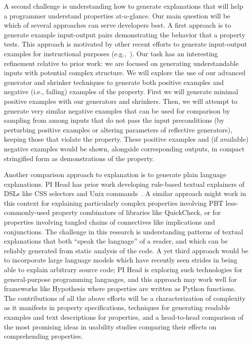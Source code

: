 A second challenge is understanding how to generate explanations that will help 
a programmer understand properties at-a-glance. Our main question will be which 
of several approaches can serve developers best. A first approach is to generate 
example input-output pairs demonstrating the behavior that a property tests.  
This approach is motivated by other recent efforts to generate input-output 
examples for instructional
purposes (e.g.,~\cite{ref:gerdes2018understanding,ref:dantoni2015can}). Our task 
has an interesting refinement relative to prior work: we are focused on 
generating understandable inputs with potential complex structure. We will
explore the use of our advanced generator and shrinker techniques to generate 
both positive examples and negative (i.e., failing) examples of the property.  
First we will generate minimal positive examples with our generators and 
shrinkers. Then, we will attempt to generate very similar negative examples that 
can be used for comparison by sampling from among inputs that do not pass the 
input preconditions (by perturbing positive examples or altering parameters of 
reflective generators), keeping those that violate the property. These positive 
examples and (if available) negative examples would be shown, alongside 
corresponding outputs, in compact stringified form as demonstrations of the 
property.

Another comparison approach to explanation is to generate plain language 
explanations. PI Head has prior work developing rule-based textual explainers of 
DSLs like CSS selectors and Unix commands~\cite{ref:head2015tutorons}. A similar 
approach might work in this context for explaining particularly complex 
properties involving PBT less-commonly-used property combinators of libraries 
like QuickCheck, or for properties involving tangled chains of connectives like 
implications and conjunctions. The challenge in this research is understanding 
patterns of textual explanations that both ``speak the language'' of a reader, 
and which can be reliably generated from static analysis of the code. A yet 
third approach would be to incorporate large language models which have recently 
seen strides in being able to explain arbitrary source code; PI Head is 
exploring such technologies for general-purpose programming languages, and this 
approach may work well for frameworks like Hypothesis where properties are 
written as Python functions. The contributions of all the above efforts will be 
a characterization of complexity as it manifests in property specifications, 
techniques for generating readable examples and text descriptions for 
properties, and a head-to-head comparison of the most promising ideas in 
usability studies comparing their effects on comprehending properties.

